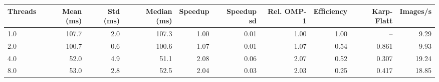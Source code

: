 \begin{tabular}{lrrrrrrrrr}
\toprule
Threads & Mean (ms) & Std (ms) & Median (ms) & Speedup & Speedup sd & Rel. OMP-1 & Efficiency & Karp-Flatt & Images/s \\
\midrule
1.0 & 107.7 & 2.0 & 107.3 & 1.00 & 0.01 & 1.00 & 1.00 & -- & 9.29 \\
2.0 & 100.7 & 0.6 & 100.6 & 1.07 & 0.01 & 1.07 & 0.54 & 0.861 & 9.93 \\
4.0 & 52.0 & 4.9 & 51.1 & 2.08 & 0.06 & 2.07 & 0.52 & 0.307 & 19.24 \\
8.0 & 53.0 & 2.8 & 52.5 & 2.04 & 0.03 & 2.03 & 0.25 & 0.417 & 18.85 \\
\bottomrule
\end{tabular}
